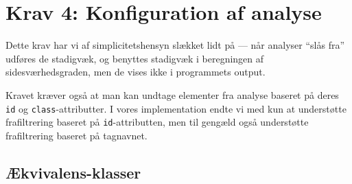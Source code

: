 \documentclass[a4paper,oneside,article, titlepage]{memoir}
\begin{document}
\section*{Krav 4: Konfiguration af analyse}

Dette krav har vi af simplicitetshensyn slækket lidt på --- når
analyser ``slås fra'' udføres de stadigvæk, og benyttes stadigvæk i
beregningen af sidesværhedsgraden, men de vises ikke i programmets
output.

Kravet kræver også at man kan undtage elementer fra analyse baseret på
deres \texttt{id} og \texttt{class}-attributter. I vores
implementation endte vi med kun at understøtte frafiltrering baseret
på \texttt{id}-attributten, men til gengæld også understøtte
frafiltrering baseret på tagnavnet.

\subsection{Ækvivalens-klasser}
\end{document}
